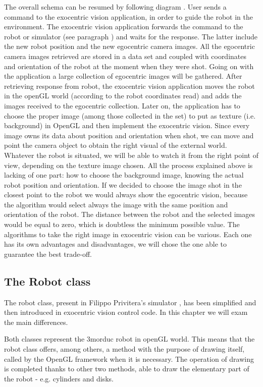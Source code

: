 The overall schema can be resumed by following diagram {}. User sends a command to the exocentric vision application, in order to guide the robot in the environment. The exocentric vision application forwards the command to the robot or simulator (see paragraph {}) and waits for the response. The latter include the new robot position and the new egocentric camera images.
All the egocentric camera images retrieved are stored in a data set and coupled with coordinates and orientation of the robot at the moment when they were shot. Going on with the application a large collection of egocentric images will be gathered.
After retrieving response from robot, the exocentric vision application moves the robot in the openGL world (according to the robot coordinates read) and adds the images received to the egocentric collection. Later on, the application has to choose the proper image (among those collected in the set) to put as texture (i.e. background) in OpenGL and then implement the exocentric vision. Since every image owns its data about position and orientation when shot, we can move and point the camera object to obtain the right visual of the external world. Whatever the robot is situated, we will be able to watch it from the right point of view, depending on the texture image chosen.
All the process explained above is lacking of one part: how to choose the background image, knowing the actual robot position and orientation. If we decided to choose the image shot in the closest point to the robot we would always show the egocentric vision, because the algorithm would select always the image with the same position and orientation of the robot. The distance between the robot and the selected images would be equal to zero, which is doubtless the minimum possible value.
The algorithms to take the right image in exocentric vision can be various. Each one has its own advantages and disadvantages, we will chose the one able to guarantee the best trade-off.


\subsection{The Robot class}
The robot class, present in Filippo Privitera's simulator 
\cite{privitera}, has been simplified and then introduced in
exocentric vision control code. In this chapter we will 
exam the main differences.
%

%
Both classes represent the 3morduc robot in openGL world. 
This means that the robot class offers, among others, a
method with the purpose of drawing itself, called by the 
OpenGL framework when it is necessary. The operation of 
drawing is completed thanks to other two methods, able 
to draw the elementary part of the robot - e.g. cylinders and disks.
%

